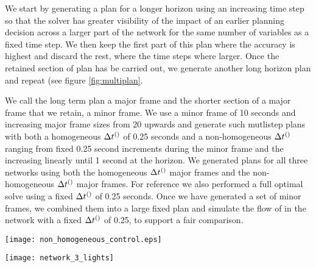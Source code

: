 We start by generating a plan for a longer horizon using an increasing
time step so that the solver has greater visibility of the impact of
an earlier planning decision across a larger part of the network for
the same number of variables as a fixed time step. We then keep the
first part of this plan where the accuracy is highest and discard the
rest, where the time steps where larger. Once the retained section of
plan has be carried out, we generate another long horizon plan and
repeat (see figure \ref{fig:multiplan}.

We call the long term plan a major frame and the shorter section of a
major frame that we retain, a minor frame. We use a minor frame of 10
seconds and increasing major frame sizes from 20 upwards and generate
such mutlistep plans with both a homogeneous $\DT[]$ of 0.25 seconds
and a non-homogeneous $\DT[]$ ranging from fixed 0.25 second increments
during the minor frame and the increasing linearly until 1 second at
the horizon. We generated plans for all three networks using both the
homogeneous $\DT[]$ major frames and the non-homogeneous $\DT[]$ major
frames. For reference we also performed a full optimal solve using a
fixed $\DT[]$ of 0.25 seconds. Once we have generated a set of minor
frames, we combined them into a large fixed plan and simulate the flow
of in the network with a fixed $\DT[]$ of 0.25, to support a fair
comparison.

\begin{figure*}[t!]
\centering
\texttt{[image: non\_homogeneous\_control.eps]}
\caption{Multi-step planning}
\label{fig:multiplan}
\end{figure*}


\begin{figure*}[t!]
\centering
\texttt{[image: network\_3\_lights]}
\caption{Network 1}
\label{fig:network3}
\end{figure*}

